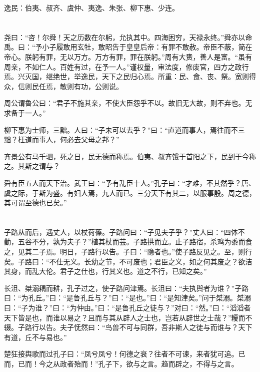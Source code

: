 \documentclass[a5paper]{ctexbook}
\begin{document}
    逸民：伯夷、叔齐、虞仲、夷逸、朱张、柳下惠、少连。

    \chapter{}

    尧曰：“咨！尔舜！天之历数在尔躬，允执其中。四海困穷，天禄永终。”舜亦以命禹。曰：“予小子履敢用玄牡，敢昭告于皇皇后帝：有罪不敢赦。帝臣不蔽，简在帝心。朕躬有罪，无以万方。万方有罪，罪在朕躬。”周有大赉，善人是富。“虽有周亲，不如仁人。百姓有过，在予一人。”谨权量，审法度，修废官，四方之政行焉。兴灭国，继绝世，举逸民，天下之民归心焉。所重：民、食、丧、祭。宽则得众，信则民任焉，敏则有功，公则说。

    周公谓鲁公曰：“君子不施其亲，不使大臣怨乎不以。故旧无大故，则不弃也。无求备于一人。”

    柳下惠为士师，三黜。人曰：“子未可以去乎？”曰：“直道而事人，焉往而不三黜？枉道而事人，何必去父母之邦？”

    齐景公有马千驷，死之日，民无德而称焉。伯夷、叔齐饿于首阳之下，民到于今称之。其斯之谓与？

    舜有臣五人而天下治。武王曰：“予有乱臣十人。”孔子曰：“才难，不其然乎？唐、虞之际，于斯为盛。有妇人焉，九人而已。三分天下有其二，以服事殷。周之德，其可谓至德也已矣。”

    \chapter{}

    子路从而后，遇丈人，以杖荷蓧。子路问曰：“子见夫子乎？”丈人曰：“四体不勤，五谷不分，孰为夫子？”植其杖而芸。子路拱而立。止子路宿，杀鸡为黍而食之，见其二子焉。明日，子路行以告。子曰：“隐者也。”使子路反见之。至，则行矣。子路曰：“不仕无义。长幼之节，不可废也；君臣之义，如之何其废之？欲洁其身，而乱大伦。君子之仕也，行其义也。道之不行，已知之矣。”

    长沮、桀溺耦而耕，孔子过之，使子路问津焉。长沮曰：“夫执舆者为谁？”子路曰：“为孔丘。”曰：“是鲁孔丘与？”曰：“是也。”曰：“是知津矣。”问于桀溺。桀溺曰：“子为谁？”曰：“为仲由。”曰：“是鲁孔丘之徒与？”对曰：“然。”曰：“滔滔者天下皆是也，而谁以易之？且而与其从辟人之士也，岂若从辟世之士哉？”耰而不辍。子路行以告。夫子怃然曰：“鸟兽不可与同群，吾非斯人之徒与而谁与？天下有道，丘不与易也。”

    楚狂接舆歌而过孔子曰：“凤兮凤兮！何德之衰？往者不可谏，来者犹可追。已而，已而！今之从政者殆而！”孔子下，欲与之言。趋而辟之，不得与之言。

    \chapter{}
\end{document}
